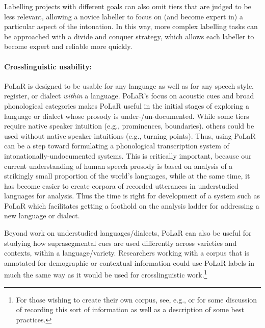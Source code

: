 Labelling projects with different goals can also omit tiers that are judged to be less relevant, allowing a novice labeller to focus on (and become expert in) a particular aspect of the intonation.  In this way, more complex labelling tasks can be approached with a divide and conquer strategy, which allows each labeller to become expert and reliable more quickly. 

\paragraph{Crosslinguistic usability:}
PoLaR is designed to be usable for any language as well as for any speech style, register, or dialect \emph{within} a language. PoLaR’s focus on acoustic cues and broad phonological categories makes PoLaR useful in the initial stages of exploring a language or dialect whose prosody is under-\slash un-documented.  While some tiers require native speaker intuition (e.g., prominences, boundaries). others could be used without native speaker intuitions (e.g., turning points).  Thus, using PoLaR can be a step toward formulating a phonological transcription system of intonationally-undocumented systems.  This is critically important, because our current understanding of human speech prosody is based on analysis of a strikingly small proportion of the world’s languages, while at the same time, it has become easier to create corpora of recorded utterances in understudied languages for analysis.  Thus the time is right for development of a system such as PoLaR which facilitates getting a foothold on the analysis ladder for addressing a new language or dialect. 

Beyond work on understudied languages\slash dialects, PoLaR can also be useful for studying how suprasegmental cues are used differently across varieties and contexts, within a language\slash variety. Researchers working with a corpus that is annotated for demographic or contextual information could use PoLaR labels in much the same way as it would be used for crosslinguistic work.\footnote{For those wishing to create their own corpus, see, e.g., \citealt{meyerhoff-11} or \citealt{podesvasharma13} for some discussion of recording this sort of information as well as a description of some best practices.}

